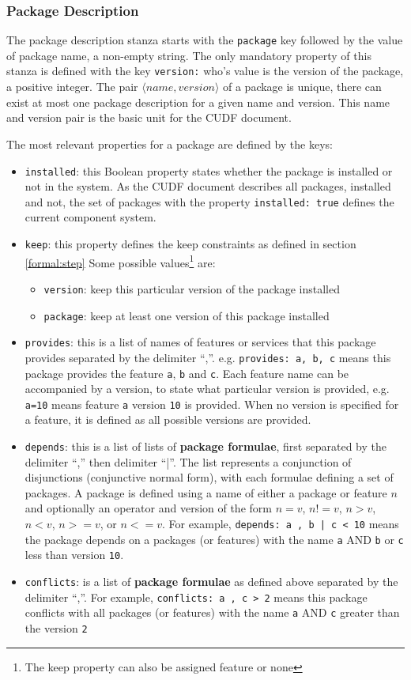 \subsubsection{Package Description}
The package description stanza starts with the \verb+package+ key followed by the value of package name, a non-empty string.
The only mandatory property of this stanza is defined with the key \verb+version:+ who's value is the version of the package, a positive integer.
The pair $\langle name, version \rangle$ of a package is unique, there can exist at most one package description for a given name and version.
This name and version pair is the basic unit for the CUDF document. 

The most relevant properties for a package are defined by the keys:
\begin{itemize}
  \item \verb+installed+: this Boolean property states whether the package is installed or not in the system. 
  As the CUDF document describes all packages, installed and not, the set of packages with the property \verb+installed: true+ defines the current component system.
  \item \verb+keep+: this property defines the keep constraints as defined in section \ref{formal:step}
  Some possible values\footnote{The keep property can also be assigned feature or none} are:
	  	\begin{itemize}
	  		\item \verb+version+: keep this particular version of the package installed
	  		\item \verb+package+: keep at least one version of this package installed
		\end{itemize}
  \item \verb+provides+: this is a list of names of features or services that this package provides separated by the delimiter ``,''.
  e.g. \verb+provides: a, b, c+ means this package provides the feature \verb+a+, \verb+b+ and \verb+c+.
  Each feature name can be accompanied by a version, to state what particular version is provided, e.g. \verb+a=10+ means feature \verb+a+ version \verb+10+ is provided.
  When no version is specified for a feature, it is defined as all possible versions are provided.
  \item \verb+depends+: this is a list of lists of \textbf{package formulae}, first separated by the delimiter ``,'' then delimiter ``|''.
  The list represents a conjunction of disjunctions (conjunctive normal form), with each formulae defining a set of packages.
  A package is defined using a name of either a package or feature $n$ and optionally an operator and version of the form  $n = v$, $n != v$, $n > v$, $n < v$, $n >= v$, or $n <= v$.
  For example, \verb+depends: a , b | c < 10+ means the package depends on a packages (or features) with the name \verb+a+ AND \verb+b+ or \verb+c+ less than version \verb+10+.  
  \item \verb+conflicts+: is a list of \textbf{package formulae} as defined above separated by the delimiter ``,''.
  For example, \verb+conflicts: a , c > 2+ means this package conflicts with all packages (or features) with the name \verb+a+ AND \verb+c+ greater than the version \verb+2+
\end{itemize}

